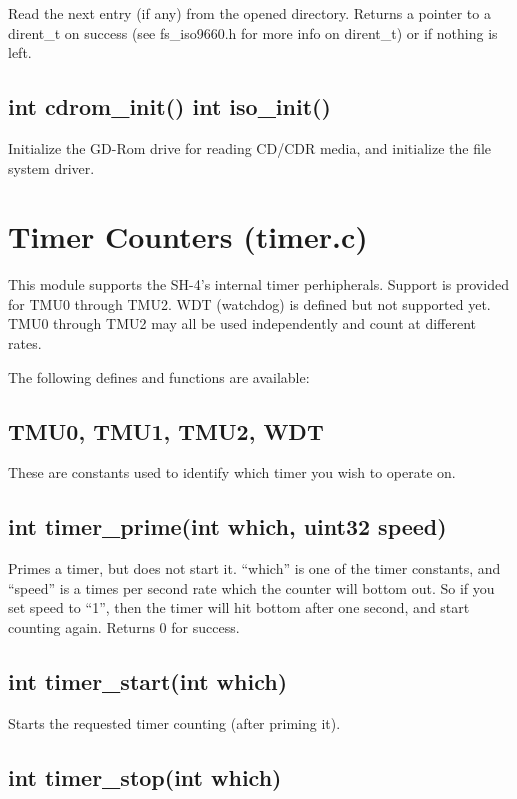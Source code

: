 \documentclass[english]{report}
\begin{document}
Read the next entry (if any) from the opened directory. Returns a
pointer to a dirent\_t on success (see fs\_iso9660.h for more info
on dirent\_t) or  if nothing is left.


\subsection{int cdrom\_init() int iso\_init()}

Initialize the GD-Rom drive for reading CD/CDR media, and initialize
the file system driver.


\section{Timer Counters (timer.c)}

This module supports the SH-4's internal timer perhipherals. Support
is provided for TMU0 through TMU2. WDT (watchdog) is defined but not
supported yet. TMU0 through TMU2 may all be used independently and
count at different rates.

The following defines and functions are available:


\subsection{TMU0, TMU1, TMU2, WDT}

These are constants used to identify which timer you wish to operate
on.


\subsection{int timer\_prime(int which, uint32 speed)}

Primes a timer, but does not start it. ``which'' is one of the
timer constants, and ``speed'' is a times per second rate which
the counter will bottom out. So if you set speed to ``1'', then
the timer will hit bottom after one second, and start counting again.
Returns 0 for success.


\subsection{int timer\_start(int which)}

Starts the requested timer counting (after priming it).


\subsection{int timer\_stop(int which)}
\end{document}
